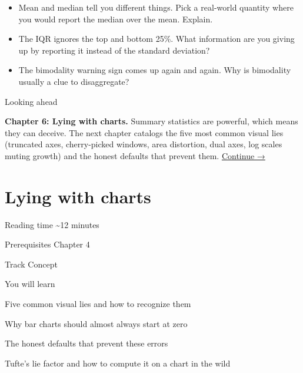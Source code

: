 \documentclass[
  letterpaper,
  11pt,
  twoside,
  openany]{scrbook}
\providecommand{\tightlist}{%
  \setlength{\itemsep}{0pt}\setlength{\parskip}{0pt}}
\begin{document}
\begin{tcolorbox}[enhanced jigsaw, arc=.35mm, bottomrule=.15mm, bottomtitle=1mm, breakable, colback=white, colbacktitle=quarto-callout-caution-color!10!white, colframe=quarto-callout-caution-color-frame, coltitle=black, left=2mm, leftrule=.75mm, opacityback=0, opacitybacktitle=0.6, rightrule=.15mm, title=\textcolor{quarto-callout-caution-color}{\faFire}\hspace{0.5em}{Reflect before moving on}, titlerule=0mm, toprule=.15mm, toptitle=1mm]

\begin{itemize}
\tightlist
\item
  Mean and median tell you different things. Pick a real-world quantity
  where you would report the median over the mean. Explain.
\item
  The IQR ignores the top and bottom 25\%. What information are you
  giving up by reporting it instead of the standard deviation?
\item
  The bimodality warning sign comes up again and again. Why is
  bimodality usually a clue to disaggregate?
\end{itemize}

\end{tcolorbox}

{Looking ahead}

\textbf{Chapter 6: Lying with charts.} Summary statistics are powerful,
which means they can deceive. The next chapter catalogs the five most
common visual lies (truncated axes, cherry-picked windows, area
distortion, dual axes, log scales muting growth) and the honest defaults
that prevent them. \href{06-lying-with-charts.qmd}{Continue →}

\chapter{Lying with charts}\label{lying-with-charts}

{Reading time} {\textasciitilde12 minutes}

{Prerequisites} {Chapter 4}

{Track} {Concept}

{You will learn}

Five common visual lies and how to recognize them

Why bar charts should almost always start at zero

The honest defaults that prevent these errors

Tufte's lie factor and how to compute it on a chart in the wild
\end{document}

